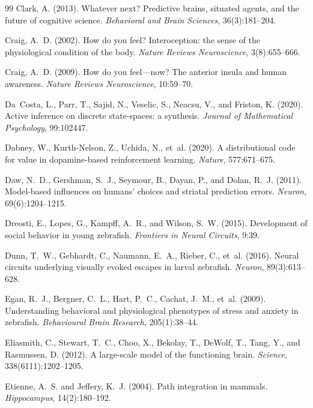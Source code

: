 \documentclass[12pt]{article}
\begin{document}
\begin{thebibliography}{99}
Clark, A. (2013).
Whatever next? Predictive brains, situated agents, and the future of cognitive science.
\textit{Behavioral and Brain Sciences}, 36(3):181--204.

Craig, A.~D. (2002).
How do you feel? Interoception: the sense of the physiological condition of the body.
\textit{Nature Reviews Neuroscience}, 3(8):655--666.

Craig, A.~D. (2009).
How do you feel---now? The anterior insula and human awareness.
\textit{Nature Reviews Neuroscience}, 10:59--70.

Da~Costa, L., Parr, T., Sajid, N., Veselic, S., Neacsu, V., and Friston, K. (2020).
Active inference on discrete state-spaces: a synthesis.
\textit{Journal of Mathematical Psychology}, 99:102447.

Dabney, W., Kurth-Nelson, Z., Uchida, N., et~al. (2020).
A distributional code for value in dopamine-based reinforcement learning.
\textit{Nature}, 577:671--675.

Daw, N.~D., Gershman, S.~J., Seymour, B., Dayan, P., and Dolan, R.~J. (2011).
Model-based influences on humans' choices and striatal prediction errors.
\textit{Neuron}, 69(6):1204--1215.

Dreosti, E., Lopes, G., Kampff, A.~R., and Wilson, S.~W. (2015).
Development of social behavior in young zebrafish.
\textit{Frontiers in Neural Circuits}, 9:39.

Dunn, T.~W., Gebhardt, C., Naumann, E.~A., Rieber, C., et~al. (2016).
Neural circuits underlying visually evoked escapes in larval zebrafish.
\textit{Neuron}, 89(3):613--628.

Egan, R.~J., Bergner, C.~L., Hart, P.~C., Cachat, J.~M., et~al. (2009).
Understanding behavioral and physiological phenotypes of stress and anxiety in zebrafish.
\textit{Behavioural Brain Research}, 205(1):38--44.

Eliasmith, C., Stewart, T.~C., Choo, X., Bekolay, T., DeWolf, T., Tang, Y., and Rasmussen, D. (2012).
A large-scale model of the functioning brain.
\textit{Science}, 338(6111):1202--1205.

Etienne, A.~S. and Jeffery, K.~J. (2004).
Path integration in mammals.
\textit{Hippocampus}, 14(2):180--192.


\end{thebibliography}
\end{document}
